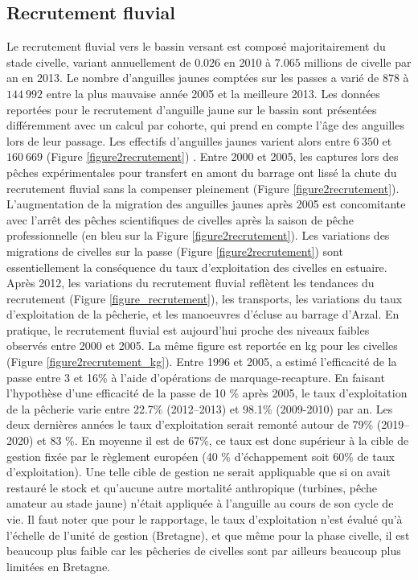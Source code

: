 \documentclass[10pt,twocolumn,titlepage,twoside]{article}\usepackage[]{graphicx}\usepackage[]{color}
\begin{document}
\subsection{Recrutement fluvial}


Le recrutement fluvial vers le bassin versant
est composé majoritairement du stade civelle, variant annuellement de
$0.026$ en 2010 à
$7.065$ millions de civelle par an en 
2013. 
Le nombre d'anguilles jaunes comptées sur les passes a varié de
$878$ à  $144~992$
entre la plus mauvaise année 2005 et la meilleure
2013. Les données reportées pour le recrutement
d'anguille jaune sur le bassin sont présentées différemment avec un calcul par
cohorte, qui prend en compte l'âge des anguilles lors de leur passage. Les
effectifs d'anguilles jaunes varient alors entre
$6~350$ et $160~669$ 
(Figure \ref{figure2recrutement}) \citep{briand_gestion_2017}.
Entre 2000 et 2005, les captures lors des pêches expérimentales pour
transfert en amont du barrage ont lissé la chute du recrutement fluvial sans la
compenser pleinement (Figure \ref{figure2recrutement}). L'augmentation de la
migration des anguilles jaunes après 2005 est concomitante avec
l'arrêt des pêches scientifiques de civelles
après la saison de pêche professionnelle (en bleu sur la Figure
\ref{figure2recrutement}). Les variations des migrations de civelles sur la
passe (Figure \ref{figure2recrutement}) sont essentiellement la conséquence du taux
d'exploitation des civelles en estuaire.
Après 2012, les variations du recrutement fluvial reflètent les tendances du
recrutement (Figure \ref{figure_recrutement}), les transports, les variations
du taux d'exploitation de la pêcherie, et les manoeuvres d'écluse au barrage
d'Arzal. En pratique, le recrutement fluvial est aujourd'hui proche des
niveaux faibles observés entre 2000 et 2005. La même figure est reportée en kg
pour les civelles (Figure \ref{figure2recrutement_kg}).
Entre 1996 et 2005, \citet{briand_dynamique_2009} a estimé l'efficacité de la
passe entre 3 et 16\% à l'aide d'opérations de marquage-recapture. En faisant
l'hypothèse d'une efficacité de la passe de 10 \% après 2005, le taux d'exploitation de la
pêcherie varie entre 22.7\% (2012--2013) et 98.1\% (2009-2010) par an. Les deux
dernières années le taux d'exploitation serait remonté autour de 79\%
(2019--2020) et 83 \%. En moyenne il est de 67\%, ce taux est donc supérieur
à la cible de gestion fixée par le règlement européen (40 \% d'échappement soit
60\% de taux d'exploitation). Une telle cible de gestion ne serait appliquable
que si on avait restauré le stock et qu'aucune autre mortalité anthropique
(turbines, pêche amateur au stade jaune) n'était appliquée à l'anguille au
cours de son cycle de vie.
Il faut noter que pour le rapportage, le taux d'exploitation n'est évalué qu'à l'échelle 
de l'unité de gestion (Bretagne), et que même pour la phase civelle, il est
beaucoup plus faible car les pêcheries de civelles sont par ailleurs beaucoup
plus limitées en Bretagne.
\end{document}
